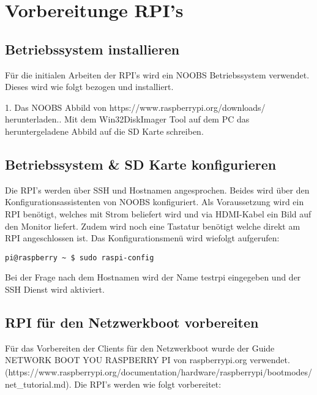 \section{Vorbereitunge RPI's}
\subsection{Betriebssystem installieren}
Für die initialen Arbeiten der RPI's wird ein NOOBS Betriebssystem verwendet. Dieses wird wie folgt bezogen und installiert.

1. Das NOOBS Abbild von https://www.raspberrypi.org/downloads/ herunterladen.. Mit dem Win32DiskImager Tool auf dem PC das heruntergeladene Abbild auf die SD Karte schreiben.

\subsection{Betriebssystem \& SD Karte konfigurieren}
Die RPI's werden über SSH und Hostnamen angesprochen. Beides wird über den Konfigurationsassistenten von NOOBS konfiguriert. Als Voraussetzung wird ein RPI benötigt, welches mit Strom beliefert wird und via HDMI-Kabel ein Bild auf den Monitor liefert. Zudem wird noch eine Tastatur benötigt welche direkt am RPI angeschlossen ist. Das Konfigurationsmenü wird wiefolgt aufgerufen:
\begin{lstlisting}
pi@raspberry ~ $ sudo raspi-config
\end{lstlisting}
Bei der Frage nach dem Hostnamen wird der Name testrpi eingegeben und der SSH Dienst wird aktiviert.

\subsection{RPI für den Netzwerkboot vorbereiten}
Für das Vorbereiten der Clients für den Netzwerkboot wurde der Guide NETWORK BOOT YOU RASPBERRY PI von raspberrypi.org verwendet. (https://www.raspberrypi.org/documentation/hardware/raspberrypi/bootmodes/net\_tutorial.md). Die RPI's werden wie folgt vorbereitet:

